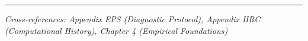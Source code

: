\vspace{1em}
\hrule
\vspace{0.5em}
\noindent\textit{Cross-references: Appendix EPS (Diagnostic Protocol), 
Appendix HRC (Computational History), Chapter 4 (Empirical Foundations)}

% 
%
%
%
%
%
%
%
